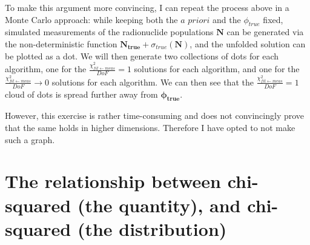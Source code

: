 \documentclass[a4paper, 12pt]{article}
\newcommand{\ve}[1]{\boldsymbol{#1}}
\newcommand{\apriori}{\textit{a priori}}
\newcommand{\chifit}{\frac{\chi^2_{fit\leftarrow meas}}{DoF} }
\begin{document}
To make this argument more convincing, I can repeat the process above in a Monte Carlo approach: while keeping both the $\apriori$ and the $\phi_{true}$ fixed, simulated measurements of the radionuclide populations $\ve{N}$ can be generated via the non-deterministic function $\ve{N_{true}} + \sigma_{true}(\ve{N})$, and the unfolded solution can be plotted as a dot. We will then generate two collections of dots for each algorithm, one for the $\chifit=1$ solutions for each algorithm, and one for the $\chifit\rightarrow0$ solutions for each algorithm. We can then see that the $\chifit=1$ cloud of dots is spread further away from $\ve{\phi_{true}}$.

However, this exercise is rather time-consuming and does not convincingly prove that the same holds in higher dimensions. Therefore I have opted to not make such a graph.

\section{The relationship between chi-squared (the quantity), and chi-squared (the distribution)}\label{Formal section}
\end{document}
